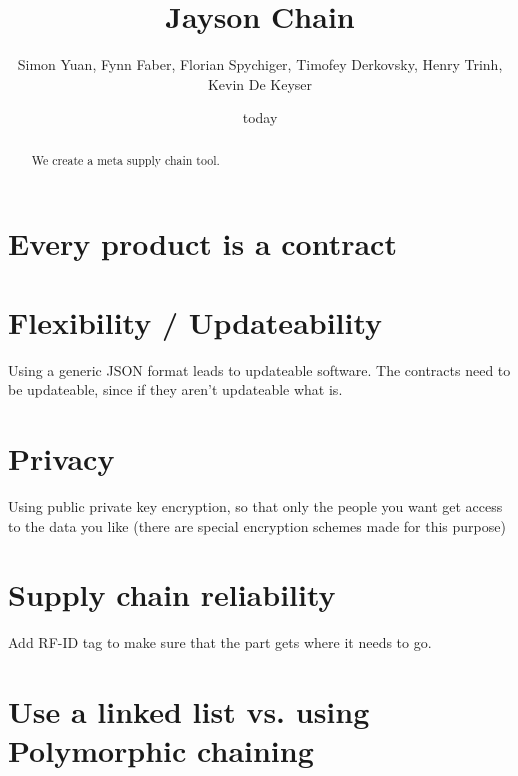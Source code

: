 \documentclass[a4paper,twoside,twocolumn]{article} %
\title{Jayson Chain}
\author{Simon Yuan, Fynn Faber, Florian Spychiger, Timofey Derkovsky, Henry Trinh, Kevin De Keyser}
\begin{document}
\maketitle
\date{today}
\begin{abstract}
	We create a meta supply chain tool.
\end{abstract}


\section{Every product is a contract}


\section{Flexibility / Updateability}
Using a generic JSON format leads to updateable software.
The contracts need to be updateable, since if they aren't updateable what is.

\section{Privacy}
Using public private key encryption, so that only the people you want get access to the data you like (there are special encryption schemes made for this purpose)

\section{Supply chain reliability}
Add RF-ID tag to make sure that the part gets where it needs to go.
\section{Use a linked list vs. using Polymorphic chaining}
\end{document}
